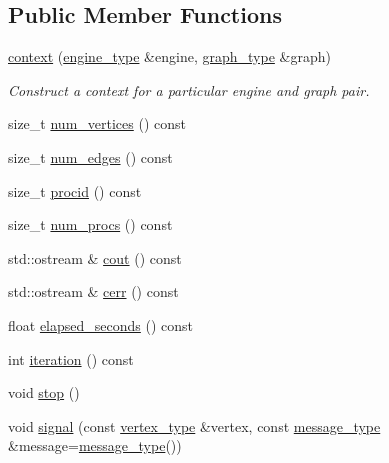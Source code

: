 \subsection*{Public Member Functions}
\begin{DoxyCompactItemize}
\item 
\hyperlink{classsaedb_1_1context_ac2248694285b99cf6fa359bf4a7ddb28}{context} (\hyperlink{classsaedb_1_1context_a10f237a9463e78f60b333d7017cbf948}{engine\-\_\-type} \&engine, \hyperlink{classsaedb_1_1context_af74463841aa837f915f43fce2ca64dca}{graph\-\_\-type} \&graph)
\begin{DoxyCompactList}\small\item\em Construct a context for a particular engine and graph pair. \end{DoxyCompactList}\item 
size\-\_\-t \hyperlink{classsaedb_1_1context_a19833a898006e8618b5f1a449569e64b}{num\-\_\-vertices} () const 
\item 
size\-\_\-t \hyperlink{classsaedb_1_1context_aa33ef2cb3e708b0eca6b502f3c962897}{num\-\_\-edges} () const 
\item 
size\-\_\-t \hyperlink{classsaedb_1_1context_a09b1e692a0b01ffb61e6abf6f5ba3c5d}{procid} () const 
\item 
size\-\_\-t \hyperlink{classsaedb_1_1context_aaa4630b0aca2bbde0167428cff7ab7e6}{num\-\_\-procs} () const 
\item 
std\-::ostream \& \hyperlink{classsaedb_1_1context_a66c19922ee1b6f5bd61ab022f2f4622a}{cout} () const 
\item 
std\-::ostream \& \hyperlink{classsaedb_1_1context_ab01112333512c57d6dc0156b6c807b99}{cerr} () const 
\item 
float \hyperlink{classsaedb_1_1context_a582c3612423e18a6891e78d96e1cc5cb}{elapsed\-\_\-seconds} () const 
\item 
int \hyperlink{classsaedb_1_1context_a0c6faad7f4c09a5a90acd58b6a413f97}{iteration} () const 
\item 
void \hyperlink{classsaedb_1_1context_a6337795d74509e592457f5d4f992573b}{stop} ()
\item 
void \hyperlink{classsaedb_1_1context_a86002f3e0ce79e720421575847cf00ac}{signal} (const \hyperlink{classsaedb_1_1context_a62f418b2b73082cd65a88feb604bab9f}{vertex\-\_\-type} \&vertex, const \hyperlink{classsaedb_1_1context_ad29784e44db80b03b0adab9a2d8f2c72}{message\-\_\-type} \&message=\hyperlink{classsaedb_1_1context_ad29784e44db80b03b0adab9a2d8f2c72}{message\-\_\-type}())
\item 

\end{DoxyCompactItemize}
